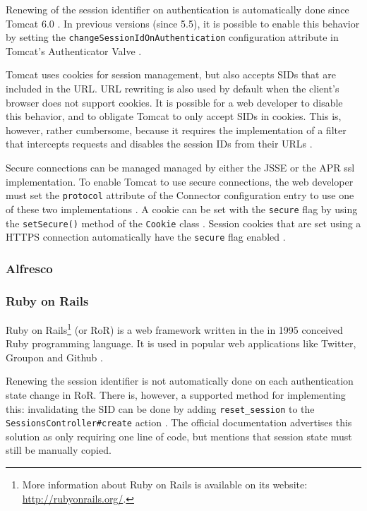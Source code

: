 Renewing of the session identifier on authentication is automatically done since Tomcat 6.0 \cite{TomcatAuthentication6}. In previous versions (since 5.5), it is possible to enable this behavior by setting the \texttt{changeSessionIdOnAuthentication} configuration attribute in Tomcat's Authenticator Valve \cite{TomcatAuthentication5}.

Tomcat uses cookies for session management, but also accepts SIDs that are included in the URL. URL rewriting is also used by default when the client's browser does not support cookies. It is possible for a web developer to disable this behavior, and to obligate Tomcat to only accept SIDs in cookies. This is, however, rather cumbersome, because it requires the implementation of a filter that intercepts requests and disables the session IDs from their URLs \cite{Condit2006}.

Secure connections can be managed managed by either the JSSE or the APR \gls{ssl} implementation. To enable Tomcat to use secure connections, the web developer must set the \texttt{protocol} attribute of the Connector configuration entry to use one of these two implementations \cite{TomcatSSL}. A cookie can be set with the \texttt{secure} flag by using the \texttt{setSecure()} method of the \texttt{Cookie} class \cite{TomcatCookie}. Session cookies that are set using a HTTPS connection automatically have the \texttt{secure} flag enabled \cite{Funk2004}.

\subsubsection{Alfresco}

\cite{TomcatPoweredBy} %

\subsubsection{Ruby on Rails}

Ruby on Rails\footnote{More information about Ruby on Rails is available on its website: \url{http://rubyonrails.org/}.} (or RoR) is a web framework written in the in 1995 conceived Ruby programming language. It is used in popular web applications like Twitter, Groupon and Github \cite{RailsApps}.

Renewing the session identifier is not automatically done on each authentication state change in RoR. There is, however, a supported method for implementing this: invalidating the SID can be done by adding \texttt{reset\_session} to the \texttt{SessionsController\#create} action \cite{Webers2008}. The official documentation advertises this solution as only requiring one line of code, but mentions that session state must still be manually copied.


